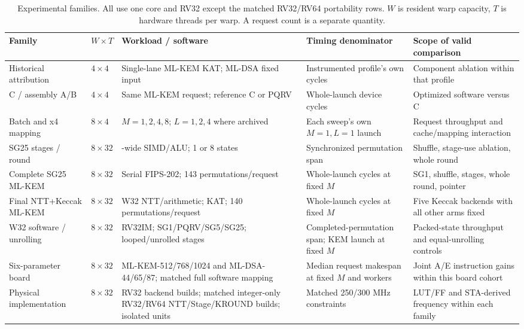 \documentclass[conference,letterpaper]{IEEEtran}
\begin{document}
\begin{table}[t]
\caption{Experimental families. All use one core and RV32 except the matched
RV32/RV64 portability rows. $W$ is resident warp capacity, $T$ is hardware
threads per warp. A request count is a separate quantity.}
\label{tab:config}
\centering\footnotesize
\begin{tabular}{@{}>{\raggedright\arraybackslash}p{}p{}>{\raggedright\arraybackslash}p{}>{\raggedright\arraybackslash}p{}>{\raggedright\arraybackslash}p{}@{}}
\toprule
Family & $W\times T$ & Workload / software & Timing denominator & Scope of valid comparison \\
\midrule
Historical attribution & $4\times4$ & Single-lane ML-KEM KAT; ML-DSA fixed input & Instrumented profile's own cycles & Component ablation within that profile \\
C / assembly A/B & $4\times4$ & Same ML-KEM request; reference C or PQRV & Whole-launch device cycles & Optimized software versus C \\
Batch and x4 mapping & $8\times4$ & $M=1,2,4,8$; $L=1,2,4$ where archived & Each sweep's own $M=1,L=1$ launch & Request throughput and cache/mapping interaction \\
SG25 stages / round & $8\times32$ & 32-wide SIMD/ALU; 1 or 8 states & Synchronized permutation span & Shuffle, stage-use ablation, whole round \\
Complete SG25 ML-KEM & $8\times32$ & Serial FIPS-202; 143 permutations/request & Whole-launch cycles at fixed $M$ & SG1, shuffle, stages, whole round, pointer \\
Final NTT+Keccak ML-KEM & $8\times32$ & W32 NTT/arithmetic; KAT; 140 permutations/request & Whole-launch cycles at fixed $M$ & Five Keccak backends with all other arms fixed \\
W32 software / unrolling & $8\times32$ & RV32IM; SG1/PQRV/SG5/SG25; looped/unrolled stages & Completed-permutation span; KEM launch at fixed $M$ & Packed-state throughput and equal-unrolling controls \\
Six-parameter board & $8\times32$ & ML-KEM-512/768/1024 and ML-DSA-44/65/87; matched full software mapping & Median request makespan at fixed $M$ and workers & Joint A/E instruction gains within this board cohort \\
Physical implementation & $8\times32$ & RV32 backend builds; matched integer-only RV32/RV64 NTT/Stage/KROUND builds; isolated units & Matched 250/300 MHz constraints & LUT/FF and STA-derived frequency within each family \\
\bottomrule
\end{tabular}
\end{table}
\end{document}

